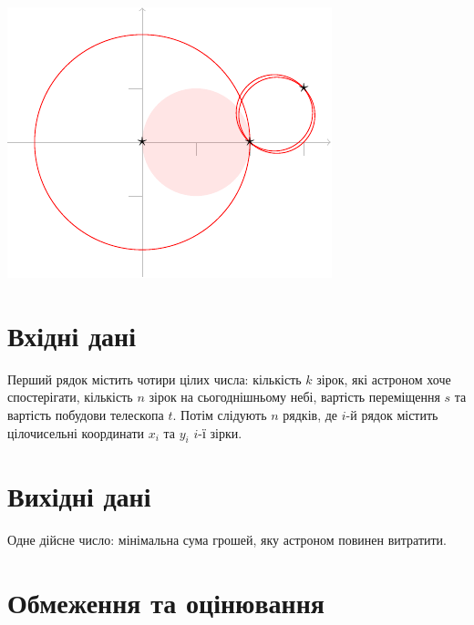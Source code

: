 \medskip
\noindent
\includegraphics[width=.3\textwidth]{img/samples.pdf}


\section*{Вхідні дані}

Перший рядок містить чотири цілих числа:
кількість $k$ зірок, які астроном хоче спостерігати,
кількість $n$ зірок на сьогоднішньому небі,
вартість переміщення $s$ та
вартість побудови телескопа $t$.
Потім слідують $n$ рядків, де $i$-й рядок містить цілочисельні координати $x_i$ та $y_i$ $i$-ї зірки.

\section*{Вихідні дані}

Одне дійсне число: мінімальна сума грошей, яку астроном повинен витратити.

\section*{Обмеження та оцінювання}

